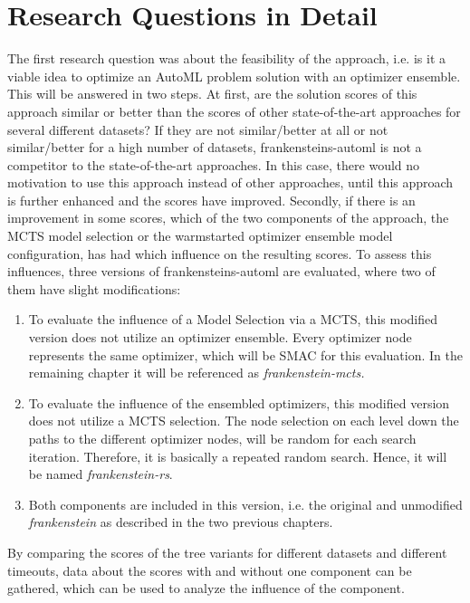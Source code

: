 \section{Research Questions in Detail}
The first research question was about the feasibility of the approach, i.e. is it a viable idea to optimize an AutoML problem solution with an optimizer ensemble.
This will be answered in two steps.\newline
At first, are the solution scores of this approach similar or better than the scores of other state-of-the-art approaches for several different datasets?
If they are not similar/better at all or not similar/better for a high number of datasets, frankensteins-automl is not a competitor to the state-of-the-art approaches.
In this case, there would no motivation to use this approach instead of other approaches, until this approach is further enhanced and the scores have improved.\newline
Secondly, if there is an improvement in some scores, which of the two components of the approach, the MCTS model selection or the warmstarted optimizer ensemble model configuration, has had which influence on the resulting scores.
To assess this influences, three versions of frankensteins-automl are evaluated, where two of them have slight modifications:
\begin{enumerate}
    \item To evaluate the influence of a Model Selection via a MCTS, this modified version does not utilize an optimizer ensemble.
    Every optimizer node represents the same optimizer, which will be SMAC for this evaluation.
    In the remaining chapter it will be referenced as \textit{frankenstein-mcts.}
    \item To evaluate the influence of the ensembled optimizers, this modified version does not utilize a MCTS selection.
    The node selection on each level down the paths to the different optimizer nodes, will be random for each search iteration.
    Therefore, it is basically a repeated random search.
    Hence, it will be named \textit{frankenstein-rs}.
    \item Both components are included in this version, i.e. the original and unmodified \textit{frankenstein} as described in the two previous chapters.
\end{enumerate}
By comparing the scores of the tree variants for different datasets and different timeouts, data about the scores with and without one component can be gathered, which can be used to analyze the influence of the component.

